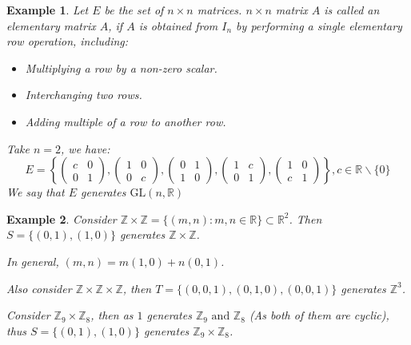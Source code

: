 \documentclass{article}
\theoremstyle{MyNonumberplain}
\theoremstyle{break}
\newcommand{\infixand}{\text{ and }}
\newcommand{\tmop}{\text}
\theoremstyle{break}
\newtheorem{example}{Example}[section]
\theoremstyle{break}
\theoremstyle{definition}
\theoremstyle{break}
\begin{document}
\begin{expbox}
    \begin{example}
        Let $E$ be the set of $n \times n$ matrices. $n \times n$ matrix $A$ is called
        an elementary matrix $A$, if $A$ is obtained from $I_n$ by performing a single
        elementary row operation, including:\bigskip

        \begin{itemize}
        \item Multiplying a row by a non-zero scalar.\bigskip
        
        \item Interchanging two rows.\bigskip
        
        \item Adding multiple of a row to another row.\bigskip
        \end{itemize}
        Take $n = 2$, we have:
        \[ E = \left\{ \left(\begin{array}{cc}
            c & 0\\
            0 & 1
        \end{array}\right), \left(\begin{array}{cc}
            1 & 0\\
            0 & c
        \end{array}\right), \left(\begin{array}{cc}
            0 & 1\\
            1 & 0
        \end{array}\right), \left(\begin{array}{cc}
            1 & c\\
            0 & 1
        \end{array}\right), \left(\begin{array}{cc}
            1 & 0\\
            c & 1
        \end{array}\right) \right\}, c \in \mathbb{R}\backslash \{ 0 \} \]
        We say that $E$ generates $\tmop{GL} (n, \mathbb{R})$
    \end{example}
\end{expbox}

\begin{expbox}
    \begin{example}
        Consider $\mathbb{Z} \times \mathbb{Z}= \{ (m, n) : m, n \in \mathbb{R} \}
        \subset \mathbb{R}^2$. Then $S = \{ (0, 1), (1, 0) \}$ generates $\mathbb{Z}
        \times \mathbb{Z}$.\bigskip

        In general, $(m, n) = m (1, 0) + n (0, 1)$.\bigskip

        Also consider $\mathbb{Z} \times \mathbb{Z} \times \mathbb{Z}$, then $T = \{
        (0, 0, 1), (0, 1, 0), (0, 0, 1) \}$ generates $\mathbb{Z}^3$.\bigskip

        Consider $\mathbb{Z}_9 \times \mathbb{Z}_8$, then as $1$ generates
        $\mathbb{Z}_9 \infixand \mathbb{Z}_8$ (As both of them are cyclic), thus $S =
        \{ (0, 1), (1, 0) \}$ generates $\mathbb{Z}_9 \times \mathbb{Z}_8$.
    \end{example}
\end{expbox}
\end{document}
